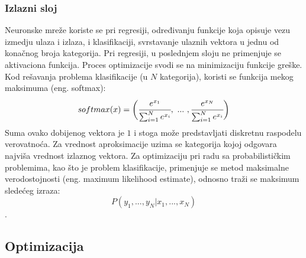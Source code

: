 \subsubsection{Izlazni sloj}

Neuronske mreže koriste se pri regresiji, određivanju funkcije koja opisuje vezu izmedju ulaza i izlaza, i klasifikaciji, svrstavanje ulaznih vektora u jednu od konačnog broja kategorija. Pri regresiji, u poslednjem sloju ne primenjuje se aktivaciona funkcija. Proces optimizacije svodi se na minimizaciju funkcije greške. Kod rešavanja problema klasifikacije (u $N$ kategorija), koristi se funkcija mekog maksimuma (eng. softmax):
\begin{equation}
	softmax(x) = \bigg( \cfrac{e^{x_1}}{\sum_{i=1}^{N} e^{x_i}}, ~...~, \cfrac{e^{x_N}}{\sum_{i=1}^{N} e^{x_i}} \bigg)
\end{equation}
Suma ovako dobijenog vektora je $1$ i stoga može predstavljati diskretnu raspodelu verovatnoća. Za vrednost aproksimacije uzima se kategorija kojoj odgovara najviša vrednost izlaznog vektora. Za optimizaciju pri radu sa probabilističkim problemima, kao što je problem klasifikacije, primenjuje se metod maksimalne verodostojnosti (eng. maximum likelihood estimate), odnosno traži se maksimum sledećeg izraza: 
\begin{equation}
	P(y_1, ..., y_N | x_1, ..., x_N)
\end{equation}.

\subsection{Optimizacija}
\label{subsec:optimizacija}

